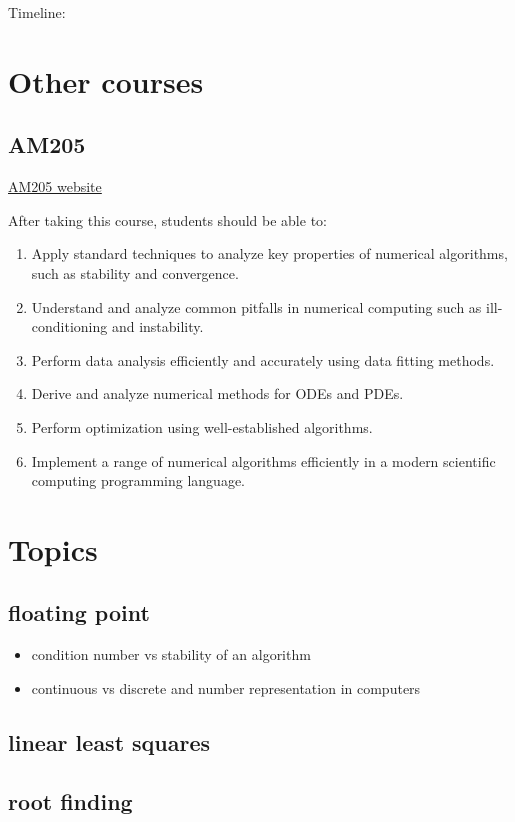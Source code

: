 \documentclass[12pt,letterpaper]{article}
\begin{document}
Timeline:


\section{Other courses}
\subsection{AM205}
\href{https://people.math.wisc.edu/~chr/am205/}{AM205 website}

After taking this course, students should be able to:
\begin{enumerate}
\itemsep0pt
    \item Apply standard techniques to analyze key properties of numerical algorithms, such as stability and convergence.
    \item Understand and analyze common pitfalls in numerical computing such as ill-conditioning and instability.
    \item Perform data analysis efficiently and accurately using data fitting methods.
    \item Derive and analyze numerical methods for ODEs and PDEs.
\item Perform optimization using well-established algorithms.
\item Implement a range of numerical algorithms efficiently in a modern scientific computing programming language.
\end{enumerate}

\section{Topics}
\subsection{floating point}
\begin{itemize}
\itemsep0pt
    \item condition number vs stability of an algorithm
    \item continuous vs discrete and number representation in computers
\end{itemize}

\subsection{linear least squares}
\subsection{root finding}
\end{document}
